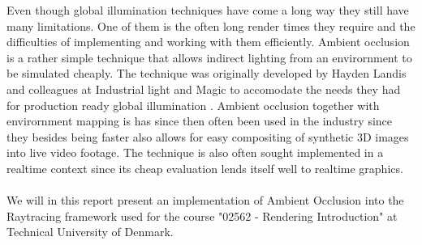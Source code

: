 Even though global illumination techniques have come a long way they still have many limitations. One of them is the often long render times they require and the difficulties of implementing and working with them efficiently. Ambient occlusion is a rather simple technique that allows indirect lighting from an envirornment to be simulated cheaply. The technique was originally developed by Hayden Landis and colleagues at Industrial light and Magic to accomodate the needs they had for production ready global illumination \cite{Landis2002}. Ambient occlusion together with envirornment mapping is has since then often been used in the industry since they besides being faster also allows for easy compositing of synthetic 3D images into live video footage\cite{Landis2002}. The technique is also often sought implemented in a realtime context since its cheap evaluation lends itself well to realtime graphics\cite{Kontkanen:2005,Umenhoffer:2009, Shanmugam:2007}.
\\ \\
We will in this report present an implementation of Ambient Occlusion into the Raytracing framework used for the course "02562 - Rendering Introduction" at Technical University of Denmark.